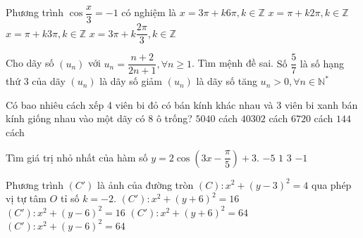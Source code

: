 \begin{ex}%
	Phương trình $ \cos\dfrac{x}{3}=-1 $ có nghiệm là
	\choice
	{\True $ x=3\pi+k6\pi,k\in\mathbb{Z} $}
	{$ x=\pi+k2\pi,k\in\mathbb{Z} $}
	{$ x=\pi+k3\pi,k\in\mathbb{Z} $}
	{$ x=3\pi+k\dfrac{2\pi}{3},k\in\mathbb{Z} $}
\end{ex}
\begin{ex}%
	Cho dãy số $ \left(u_n\right) $ với $ u_n=\dfrac{n+2}{2n+1}, \forall n\ge 1$. Tìm mệnh đề sai.
	\choice
	{Số $ \dfrac{5}{7} $ là số hạng thứ 3 của dãy}
	{\True $ \left(u_n\right) $ là dãy số giảm}
	{$ \left(u_n\right) $ là dãy số tăng}
	{$ u_n>0,\forall n\in\mathbb{N}^* $}
\end{ex}
\begin{ex}%
	Có bao nhiêu cách xếp 4 viên bi đỏ có bán kính khác nhau và 3 viên bi xanh bán kính giống nhau vào một dãy có 8 ô trống? 
	\choice
	{$ 5040 $ cách}
	{$ 40302 $ cách}
	{\True $ 6720 $ cách}
	{$ 144 $ cách}
\end{ex}
\begin{ex}%
	Tìm giá trị nhỏ nhất của hàm số $ y=2\cos\left(3x-\dfrac{\pi}{5}\right)+3$.
	\choice
	{$ -5 $}
	{\True $ 1 $}
	{$ 3 $}
	{$ -1 $}
\end{ex}
\begin{ex}%
	Phương trình  $ (C') $ là ảnh của đường tròn $ (C)\colon x^2+(y-3)^2=4 $ qua phép vị tự tâm $ O $ tỉ số $ k=-2 $.
	\choice
	{\True $ (C')\colon x^2+(y+6)^2=16 $}
	{$ (C')\colon x^2+(y-6)^2=16 $}
	{$ (C')\colon x^2+(y+6)^2=64 $}
	{$ (C')\colon x^2+(y-6)^2=64 $}
\end{ex}
